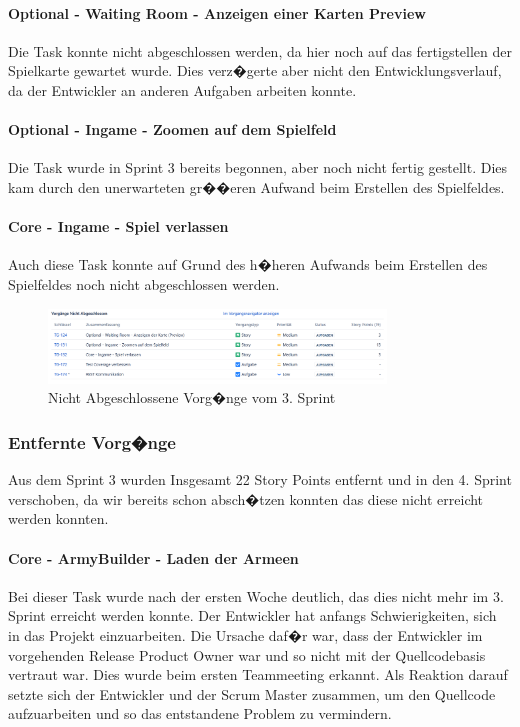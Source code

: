 \documentclass[12pt, titlepage]{scrartcl}
\begin{document}
			\paragraph{Optional - Waiting Room - Anzeigen einer Karten Preview}
			Die Task konnte nicht abgeschlossen werden, da hier noch auf das fertigstellen der Spielkarte gewartet wurde. Dies verz�gerte aber nicht den Entwicklungsverlauf, da der Entwickler an anderen Aufgaben arbeiten konnte. 
			
			\paragraph{Optional - Ingame - Zoomen auf dem Spielfeld}
			Die Task wurde in Sprint 3 bereits begonnen, aber noch nicht fertig gestellt. Dies kam durch den unerwarteten gr��eren Aufwand beim Erstellen des Spielfeldes.
			
			\paragraph{Core - Ingame - Spiel verlassen}
			Auch diese Task konnte auf Grund des h�heren Aufwands beim Erstellen des Spielfeldes noch nicht abgeschlossen werden. 
			
				\begin{figure}[H] 
					\centering
					\includegraphics[width=0.8\textwidth]{Nicht_Abgeschlossene_Vorgaenge_Sprint_3.PNG}
					\caption{Nicht Abgeschlossene Vorg�nge vom 3. Sprint}
					\label{NichtAbgeschlosseneVorgaengeSprint3}
				\end{figure}
		\subsubsection{Entfernte Vorg�nge}
		Aus dem Sprint 3 wurden Insgesamt 22 Story Points entfernt und in den 4. Sprint verschoben, da wir bereits schon absch�tzen konnten das diese nicht erreicht werden konnten. 
			
			\paragraph{Core - ArmyBuilder - Laden der Armeen} \label{ProblemOne}Bei dieser Task wurde nach der ersten Woche deutlich, das dies nicht mehr im 3. Sprint erreicht werden konnte. Der Entwickler hat anfangs Schwierigkeiten, sich in das Projekt einzuarbeiten. Die Ursache daf�r war, dass der Entwickler im vorgehenden Release Product Owner war und so nicht  mit der Quellcodebasis vertraut war. Dies wurde beim ersten Teammeeting erkannt. Als Reaktion darauf setzte sich der Entwickler und der Scrum Master zusammen, um den Quellcode aufzuarbeiten und so das entstandene Problem zu vermindern.
			
\end{document}
